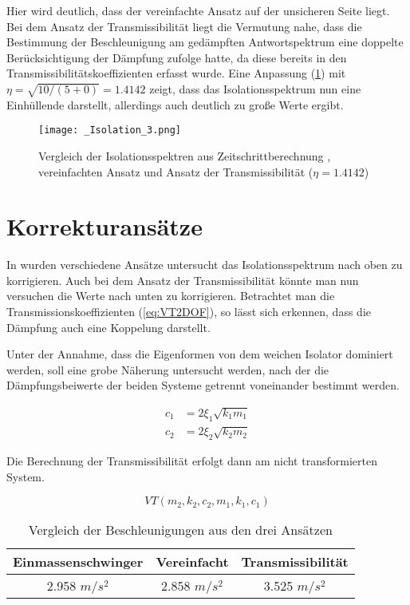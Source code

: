 Hier wird deutlich, dass der vereinfachte Ansatz auf der unsicheren Seite liegt.
Bei dem Ansatz der Transmissibilität liegt die Vermutung nahe, dass die Bestimmung der Beschleunigung am gedämpften Antwortspektrum eine doppelte Berücksichtigung der Dämpfung zufolge hatte, da diese bereits in den Transmissibilitätskoeffizienten erfasst wurde.
Eine Anpassung (\cref{fig:Isolation2}) mit $\eta = \sqrt{10/(5+0)} = 1.4142$ zeigt, dass das Isolationsspektrum nun eine Einhüllende darstellt, allerdings auch deutlich zu große Werte ergibt.

\begin{figure}[H]
    \centering
    \texttt{[image: \_Isolation\_3.png]}
    \caption{Vergleich der Isolationsspektren aus Zeitschrittberechnung \cite{Isemann}, vereinfachten Ansatz und Ansatz der Transmissibilität ($\eta = 1.4142$)}
    \label{fig:Isolation2}
\end{figure}

\section{Korrekturansätze}
\label{sec:Korrekturansaetze}

In \cite{Isemann} wurden verschiedene Ansätze untersucht das Isolationsspektrum nach oben zu korrigieren.
Auch bei dem Ansatz der Transmissibilität könnte man nun versuchen die Werte nach unten zu korrigieren. Betrachtet man die Transmissionskoeffizienten (\cref{eq:VT2DOF}), so lässt sich erkennen, dass die Dämpfung auch eine Koppelung darstellt. 

Unter der Annahme, dass die Eigenformen von dem weichen Isolator dominiert werden, soll eine grobe Näherung untersucht werden, nach der die Dämpfungsbeiwerte der beiden Systeme getrennt voneinander bestimmt werden.

\begin{align*}
c_1 &= 2 \xi_1 \sqrt{k_1 m_1}\\
c_2 &= 2 \xi_2 \sqrt{k_2 m_2}
\end{align*}

Die Berechnung der Transmissibilität erfolgt dann am nicht transformierten System.

\begin{equation*}
VT(m_2, k_2, c_2, m_1, k_1, c_1)
\end{equation*} 

\begin{table}[H]
\centering
\begin{tabular}{ |c|c|c| } 
 \hline
 Einmassenschwinger & Vereinfacht & Transmissibilität\\
 \hline\hline
 2.958 $m/s^2$ & 2.858 $m/s^2$ & 3.525 $m/s^2$\\
 \hline
\end{tabular}
\caption{Vergleich der Beschleunigungen aus den drei Ansätzen}
\end{table}

